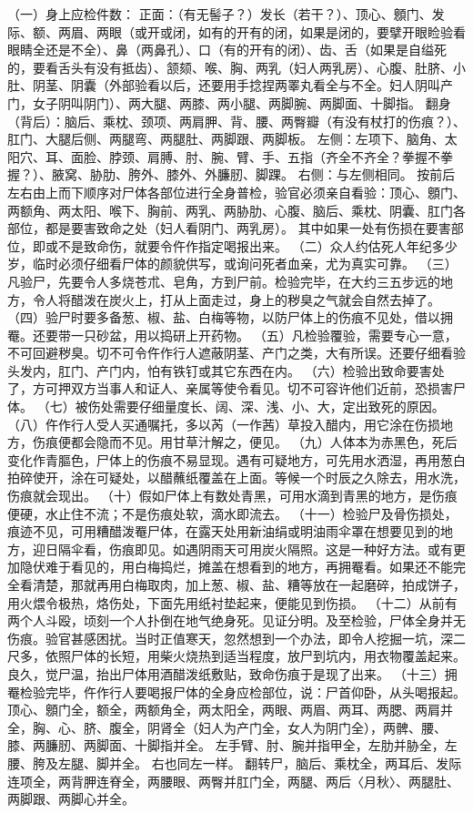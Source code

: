 \documentclass[12pt,UTF8]{ctexbook}
\begin{document}
（一）身上应检件数：
正面：（有无髻子？）发长（若干？）、顶心、顖门、发际、额、两眉、两眼（或开或闭，如有的开有的闭，如果是闭的，要擘开眼睑验看眼睛全还是不全）、鼻（两鼻孔）、口（有的开有的闭）、齿、舌（如果是自缢死的，要看舌头有没有抵齿）、颔颏、喉、胸、两乳（妇人两乳房）、心腹、肚脐、小肚、阴茎、阴囊（外部验看以后，还要用手捻捏两睪丸看全与不全。妇人阴叫产门，女子阴叫阴门）、两大腿、两膝、两小腿、两脚腕、两脚面、十脚指。
翻身（背后）：脑后、乘枕、颈项、两肩胛、背、腰、两臀瓣（有没有杖打的伤痕？）、肛门、大腿后侧、两腿弯、两腿肚、两脚跟、两脚板。
左侧：左项下、脑角、太阳穴、耳、面脸、脖颈、肩膊、肘、腕、臂、手、五指（齐全不齐全？拳握不拳握？）、腋窝、胁肋、胯外、膝外、外臁肕、脚踝。
右侧：与左侧相同。
按前后左右由上而下顺序对尸体各部位进行全身普检，验官必须亲自看验：顶心、顖门、两额角、两太阳、喉下、胸前、两乳、两胁肋、心腹、脑后、乘枕、阴囊、肛门各部位，都是要害致命之处（妇人看阴门、两乳房）。
其中如果一处有伤损在要害部位，即或不是致命伤，就要令仵作指定喝报出来。
（二）众人约估死人年纪多少岁，临时必须仔细看尸体的颜貌供写，或询问死者血亲，尤为真实可靠。
（三）凡验尸，先要令人多烧苍朮、皂角，方到尸前。检验完毕，在大约三五步远的地方，令人将醋泼在炭火上，打从上面走过，身上的秽臭之气就会自然去掉了。
（四）验尸时要多备葱、椒、盐、白梅等物，以防尸体上的伤痕不见处，借以拥罨。还要带一只砂盆，用以捣研上开药物。
（五）凡检验覆验，需要专心一意，不可回避秽臭。切不可令仵作行人遮蔽阴茎、产门之类，大有所误。还要仔细看验头发内，肛门、产门内，怕有铁钉或其它东西在内。
（六）检验出致命要害处了，方可押双方当事人和证人、亲属等使令看见。切不可容许他们近前，恐损害尸体。
（七）被伤处需要仔细量度长、阔、深、浅、小、大，定出致死的原因。
（八）仵作行人受人买通嘱托，多以芮（一作茜）草投入醋内，用它涂在伤损地方，伤痕便都会隐而不见。用甘草汁解之，便见。
（九）人体本为赤黑色，死后变化作青膒色，尸体上的伤痕不易显现。遇有可疑地方，可先用水洒湿，再用葱白拍碎使开，涂在可疑处，以醋蘸纸覆盖在上面。等候一个时辰之久除去，用水洗，伤痕就会现出。
（十）假如尸体上有数处青黑，可用水滴到青黑的地方，是伤痕便硬，水止住不流；不是伤痕处软，滴水即流去。
（十一）检验尸及骨伤损处，痕迹不见，可用糟醋泼罨尸体，在露天处用新油绢或明油雨伞罩在想要见到的地方，迎日隔伞看，伤痕即见。如遇阴雨天可用炭火隔照。这是一种好方法。或有更加隐伏难于看见的，用白梅捣烂，摊盖在想看到的地方，再拥罨看。如果还不能完全看清楚，那就再用白梅取肉，加上葱、椒、盐、糟等放在一起磨碎，拍成饼子，用火煨令极热，烙伤处，下面先用纸衬垫起来，便能见到伤损。
（十二）从前有两个人斗殴，顷刻一个人扑倒在地气绝身死。见证分明。及至检验，尸体全身并无伤痕。验官甚感困扰。当时正值寒天，忽然想到一个办法，即令人挖掘一坑，深二尺多，依照尸体的长短，用柴火烧热到适当程度，放尸到坑内，用衣物覆盖起来。良久，觉尸温，抬出尸体用酒醋泼纸敷贴，致命伤痕于是现了出来。
（十三）拥罨检验完毕，仵作行人要喝报尸体的全身应检部位，说：尸首仰卧，从头喝报起。顶心、顖门全，额全，两额角全，两太阳全，两眼、两眉、两耳、两腮、两肩并全，胸、心、脐、腹全，阴肾全（妇人为产门全，女人为阴门全），两髀、腰、膝、两臁肕、两脚面、十脚指并全。
左手臂、肘、腕并指甲全，左肋并胁全，左腰、胯及左腿、脚并全。
右也同左一样。
翻转尸，脑后、乘枕全，两耳后、发际连项全，两背胛连脊全，两腰眼、两臀并肛门全，两腿、两后〈月秋〉、两腿肚、两脚跟、两脚心并全。
\end{document}
